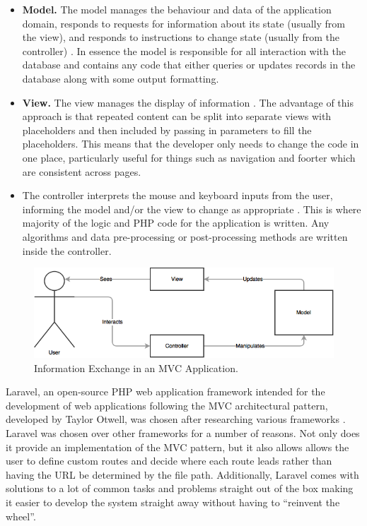 \begin{itemize}
	\item \textbf{Model.} The model manages the behaviour and data of the application domain, responds to requests for information about its state (usually from the view), and responds to instructions to change state (usually from the controller) \cite{MSDN:MVC}. In essence the model is responsible for all interaction with the database and contains any code that either queries or updates records in the database along with some output formatting.
	\item \textbf{View.} The view manages the display of information \cite{MSDN:MVC}. The advantage of this approach is that repeated content can be split into separate views with placeholders and then included by passing in parameters to fill the placeholders. This means that the developer only needs to change the code in one place, particularly useful for things such as navigation and foorter which are consistent across pages.
	\item The controller interprets the mouse and keyboard inputs from the user, informing the model and/or the view to change as appropriate \cite{MSDN:MVC}. This is where majority of the logic and PHP code for the application is written. Any algorithms and data pre-processing or post-processing methods are written inside the controller.
\end{itemize}

\begin{figure}[H]
  \centering
  \includegraphics[width=1.0\textwidth]{images/mvc}
  \caption{Information Exchange in an MVC Application.} \label{fig:MVC} 
\end{figure}

Laravel, an open-source PHP web application framework intended for the development of web applications following the MVC architectural pattern, developed by Taylor Otwell, was chosen after researching various frameworks \cite{Laravel:Home}. Laravel was chosen over other frameworks for a number of reasons. Not only does it provide an implementation of the MVC pattern, but it also allows allows the user to define custom routes and decide where each route leads rather than having the URL be determined by the file path. Additionally, Laravel comes with solutions to a lot of common tasks and problems straight out of the box making it easier to develop the system straight away without having to ``reinvent the wheel''.

